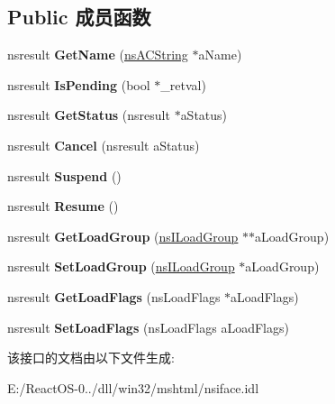 \subsection*{Public 成员函数}
\begin{DoxyCompactItemize}
\item 
\mbox{\label{interfacens_i_request_a1ab3051bda18bb46dbf0c5989a90e99a}} 
nsresult {\bfseries Get\+Name} (\hyperlink{structns_c_string_container}{ns\+A\+C\+String} $\ast$a\+Name)
\item 
\mbox{\label{interfacens_i_request_ae2947af3090b6224d00b798aeb8d48d9}} 
nsresult {\bfseries Is\+Pending} (bool $\ast$\+\_\+retval)
\item 
\mbox{\label{interfacens_i_request_aaa41741eac3571afcf726635f14f29ea}} 
nsresult {\bfseries Get\+Status} (nsresult $\ast$a\+Status)
\item 
\mbox{\label{interfacens_i_request_af2dedea6a78baa0112baaf0c0869de7e}} 
nsresult {\bfseries Cancel} (nsresult a\+Status)
\item 
\mbox{\label{interfacens_i_request_a173305614f82f34a6589664f98a00bfb}} 
nsresult {\bfseries Suspend} ()
\item 
\mbox{\label{interfacens_i_request_a8bb752572361364d1ce627397d011991}} 
nsresult {\bfseries Resume} ()
\item 
\mbox{\label{interfacens_i_request_aca2c78de76087cbdcd4f2a70311503cf}} 
nsresult {\bfseries Get\+Load\+Group} (\hyperlink{interfacens_i_load_group}{ns\+I\+Load\+Group} $\ast$$\ast$a\+Load\+Group)
\item 
\mbox{\label{interfacens_i_request_aabe7c265cc5447ec64b4185854242773}} 
nsresult {\bfseries Set\+Load\+Group} (\hyperlink{interfacens_i_load_group}{ns\+I\+Load\+Group} $\ast$a\+Load\+Group)
\item 
\mbox{\label{interfacens_i_request_ad5c5089d69ed40838a0de17147b04124}} 
nsresult {\bfseries Get\+Load\+Flags} (ns\+Load\+Flags $\ast$a\+Load\+Flags)
\item 
\mbox{\label{interfacens_i_request_a1563ebc26c96db79fa2f3dccf30b6ba7}} 
nsresult {\bfseries Set\+Load\+Flags} (ns\+Load\+Flags a\+Load\+Flags)
\end{DoxyCompactItemize}


该接口的文档由以下文件生成\+:\begin{DoxyCompactItemize}
\item 
E\+:/\+React\+O\+S-\/0../dll/win32/mshtml/nsiface.\+idl\end{DoxyCompactItemize}
